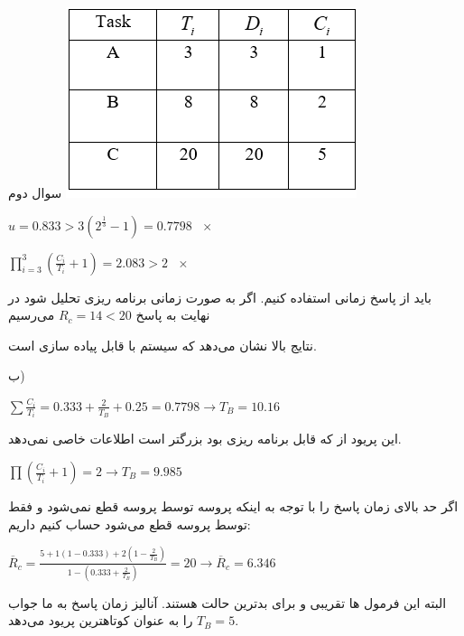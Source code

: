 \documentclass[12pt]{article}
\begin{document}
    \begin{problem}{سوال دوم}
    	\centering
    	\includegraphics[scale=1]{Resources/2.png}
    	
    	\raggedleft
    	$u = 0.833 > 3(2^\frac{1}{3} - 1) = 0.7798\,\,\,\,\times$
    	
    	$\prod\limits_{i=3}^{3}{\left( \frac{{{C}_{i}}}{{{T}_{i}}}+1 \right)}=2.083>2\,\,\,\,\times $
 		
 		\raggedright
 		باید از پاسخ زمانی استفاده کنیم. اگر به صورت زمانی برنامه ریزی تحلیل شود در نهایت به پاسخ
 		$R_c = 14 < 20$
 		می‌رسیم
 		
 		نتایج بالا نشان می‌دهد که سیستم با  قابل پیاده سازی است.
 		
 		ب)
 		
 		\raggedleft
 		$\sum{\frac{{{C}_{i}}}{{{T}_{i}}}}=0.333+\frac{2}{{{T}_{B}}}+0.25=0.7798\to {{T}_{B}}=10.16$
 		
 		\raggedright
 		این پریود از  که قابل برنامه ریزی بود بزرگتر است اطلاعات خاصی نمی‌دهد.
 		
 		\raggedleft
 		$\prod{\left( \frac{{{C}_{i}}}{{{T}_{i}}}+1 \right)}=2\to {{T}_{B}}=9.985$
 		
 		\raggedright
 		اگر حد بالای زمان پاسخ را با توجه به اینکه پروسه  توسط پروسه  قطع نمی‌شود و فقط توسط پروسه  قطع می‌شود حساب کنیم داریم:
 		
 		\raggedleft
 		${{\overline{R}}_{c}}=\frac{5+1(1-0.333)+2(1-\frac{2}{{{T}_{B}}})}{1-(0.333+\frac{2}{{{T}_{B}}})}=20\to {{\overline{R}}_{c}}=6.346$
 		
 		\raggedright
 		البته این فرمول ها تقریبی و برای بدترین حالت هستند. آنالیز زمان پاسخ به ما جواب 
 		$T_B = 5$
 		را به عنوان کوتاهترین پریود می‌دهد.
 		
    
    \end{problem}
   
\end{document}
